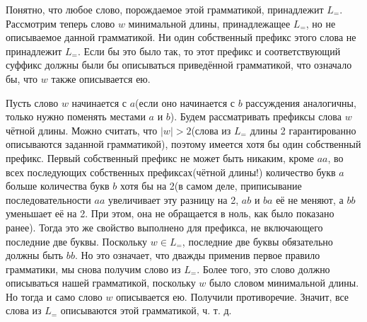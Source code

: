 \documentclass[11pt]{article}
\begin{document}
Понятно, что любое слово, порождаемое этой грамматикой, принадлежит $L_=$. Рассмотрим теперь
слово $w$ минимальной длины, принадлежащее $L_=$, но не описываемое данной грамматикой. Ни один
собственный префикс этого слова не принадлежит $L_=$. Если бы это было так, то этот префикс
и соответствующий суффикс должны были бы описываться приведённой грамматикой, что означало бы,
что $w$ также описывается ею.

Пусть слово $w$ начинается с $a$(если оно начинается с $b$ рассуждения аналогичны, только нужно
поменять местами $a$ и $b$). Будем рассматривать префиксы слова $w$ чётной длины. Можно считать,
что $|w| > 2$(слова из $L_=$ длины 2 гарантированно описываются заданной грамматикой), поэтому
имеется хотя бы один собственный префикс. Первый собственный префикс не может быть никаким,
кроме $aa$, во всех последующих собственных префиксах(чётной длины!) количество букв $a$
больше количества букв $b$ хотя бы на 2(в самом деле, приписывание последовательности $aa$
увеличивает эту разницу на 2, $ab$ и $ba$ её не меняют, а $bb$ уменьшает её на 2. При этом,
она не обращается в ноль, как было показано ранее). Тогда это же свойство выполнено для
префикса, не включающего последние две буквы. Поскольку $w \in L_=$, последние две буквы
обязательно должны быть $bb$. Но это означает, что дважды применив первое правило грамматики,
мы снова получим слово из $L_=$. Более того, это слово должно описываться нашей грамматикой,
поскольку $w$ было словом минимальной длины. Но тогда и само слово $w$ описывается ею.
Получили противоречие. Значит, все слова из $L_=$ описываются этой грамматикой, ч. т. д.
\end{document}
